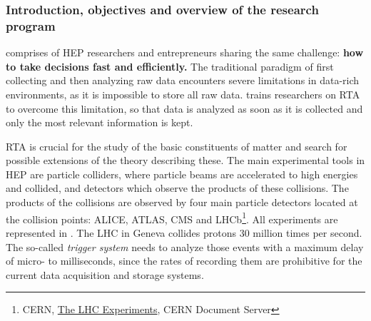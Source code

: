 
\subsubsection{Introduction, objectives and overview of the research program}
\label{sec:introRO}

\acronym comprises of HEP researchers and entrepreneurs sharing the same challenge: \textbf{how to take decisions fast and efficiently.}
The traditional paradigm of first collecting and then analyzing raw data encounters severe limitations in data-rich environments, as it is impossible to store all raw data.
\acronym trains researchers on RTA to overcome this limitation, so that data is analyzed as soon as it is collected and only the most relevant information is kept. 


RTA is crucial for the study of the basic constituents of matter and search for possible extensions of the theory describing these. 
The main experimental tools in HEP are particle colliders, where particle beams are accelerated to high energies and collided, and detectors which observe the products of these collisions. 
The products of the collisions are observed by four main particle detectors located at the collision points: ALICE, ATLAS, CMS and LHCb\footnote{CERN, \href{http://cds.cern.ch/record/1997374}{The LHC Experiments}, CERN Document Server}.
All experiments are represented in \acronym. 
The LHC in Geneva collides protons 30 million times per second.
The so-called \textit{trigger system} needs to analyze those events with a maximum delay of micro- to milliseconds, since the rates of recording them are prohibitive for the current data acquisition and storage systems. 

